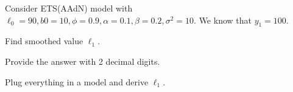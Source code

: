 
\begin{question}
Consider ETS(AAdN) model with \(\ell_0 = 90, b0 = 10, \phi=0.9, \alpha=0.1,\beta=0.2,\sigma^2=10\). We know that \(y_1=100\).

Find smoothed value \(\ell_1\).

Provide the answer with 2 decimal digits.
\end{question}

\begin{solution}
Plug everything in a model and derive \(\ell_1\).
\end{solution}

